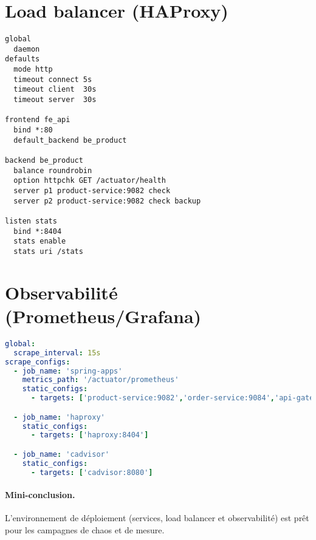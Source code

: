 \section{Load balancer (HAProxy)}
\begin{lstlisting}[caption={infra/haproxy/haproxy.cfg (extrait)}, label={lst:haproxy}]
global
  daemon
defaults
  mode http
  timeout connect 5s
  timeout client  30s
  timeout server  30s

frontend fe_api
  bind *:80
  default_backend be_product

backend be_product
  balance roundrobin
  option httpchk GET /actuator/health
  server p1 product-service:9082 check
  server p2 product-service:9082 check backup

listen stats
  bind *:8404
  stats enable
  stats uri /stats
\end{lstlisting}

\section{Observabilité (Prometheus/Grafana)}
\begin{lstlisting}[language=YAML, caption={infra/monitoring/prometheus.yml (extrait)}, label={lst:prom}]
global:
  scrape_interval: 15s
scrape_configs:
  - job_name: 'spring-apps'
    metrics_path: '/actuator/prometheus'
    static_configs:
      - targets: ['product-service:9082','order-service:9084','api-gateway:9080']

  - job_name: 'haproxy'
    static_configs:
      - targets: ['haproxy:8404']

  - job_name: 'cadvisor'
    static_configs:
      - targets: ['cadvisor:8080']
\end{lstlisting}

\paragraph{Mini-conclusion.}
L'environnement de déploiement (services, load balancer et observabilité) est prêt pour
les campagnes de chaos et de mesure.